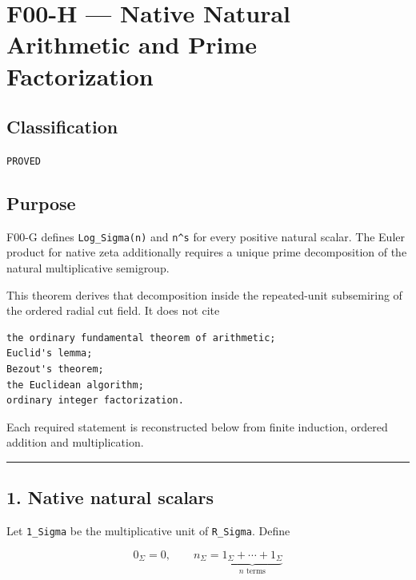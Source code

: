 \hypertarget{f00-h-native-natural-arithmetic-and-prime-factorization}{%
\chapter{F00-H --- Native Natural Arithmetic and Prime Factorization}\label{f00-h-native-natural-arithmetic-and-prime-factorization}}

\hypertarget{classification}{%
\section{Classification}\label{classification}}

\texttt{PROVED}

\hypertarget{purpose}{%
\section{Purpose}\label{purpose}}

F00-G defines \texttt{Log\_Sigma(n)} and \texttt{n\^{}s} for every positive natural scalar. The
Euler product for native zeta additionally requires a unique prime decomposition
of the natural multiplicative semigroup.

This theorem derives that decomposition inside the repeated-unit subsemiring of
the ordered radial cut field. It does not cite

\begin{verbatim}
the ordinary fundamental theorem of arithmetic;
Euclid's lemma;
Bezout's theorem;
the Euclidean algorithm;
ordinary integer factorization.
\end{verbatim}

Each required statement is reconstructed below from finite induction, ordered
addition and multiplication.

\begin{center}\rule{0.5\linewidth}{0.5pt}\end{center}

\hypertarget{native-natural-scalars}{%
\section{1. Native natural scalars}\label{native-natural-scalars}}

Let \texttt{1\_Sigma} be the multiplicative unit of \texttt{R\_Sigma}. Define

\[
0_\Sigma=0,
\qquad
n_\Sigma=\underbrace{1_\Sigma+\cdots+1_\Sigma}_{n\text{ terms}}
\]

